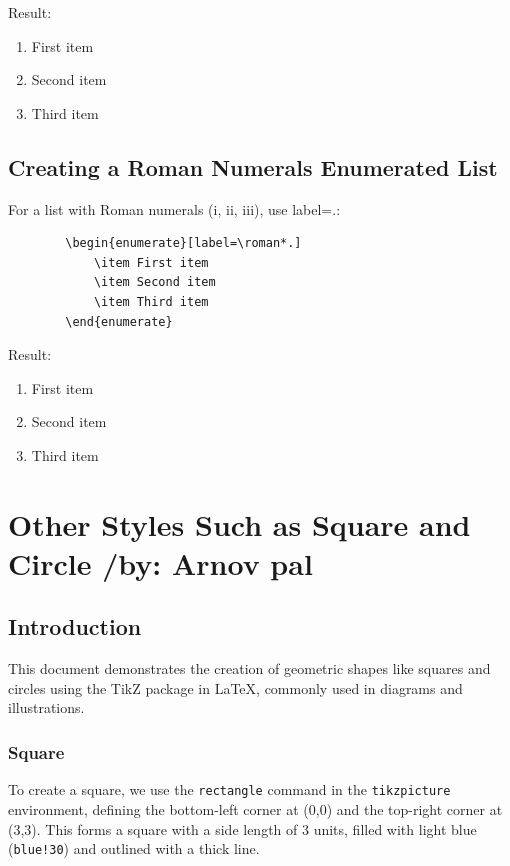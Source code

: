 \documentclass[12pt,a4paper]{article}
\begin{document}
	Result:
	
	\begin{enumerate}[label=\alph*.]
		\item First item
		\item Second item
		\item Third item
	\end{enumerate}
	
	\subsection{Creating a Roman Numerals Enumerated List}
	For a list with Roman numerals (i, ii, iii), use label=\roman*.:
	
	\begin{verbatim}
		\begin{enumerate}[label=\roman*.]
			\item First item
			\item Second item
			\item Third item
		\end{enumerate}
	\end{verbatim}
	
	Result:
	
	\begin{enumerate}[label=\roman*.]
		\item First item
		\item Second item
		\item Third item
	\end{enumerate}
 \newpage
 \section{Other Styles Such as Square and Circle /by: Arnov pal}
 \subsection{Introduction}
This document demonstrates the creation of geometric shapes like squares and circles using the TikZ package in LaTeX, commonly used in diagrams and illustrations.

\subsubsection{Square}
To create a square, we use the \texttt{rectangle} command in the \texttt{tikzpicture} environment, defining the bottom-left corner at (0,0) and the top-right corner at (3,3). This forms a square with a side length of 3 units, filled with light blue (\texttt{blue!30}) and outlined with a thick line.
\end{document}
